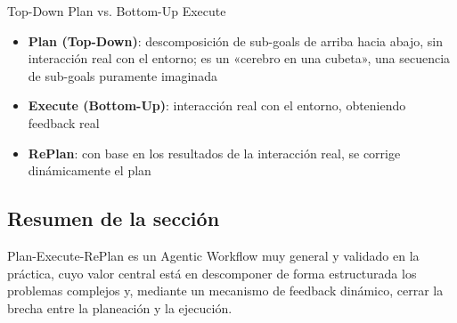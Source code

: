 \begin{knowledgebox}{Top-Down Plan vs. Bottom-Up Execute}
\begin{itemize}
    \item \textbf{Plan (Top-Down)}: descomposición de sub-goals de arriba hacia abajo, sin interacción real con el entorno; es un «cerebro en una cubeta», una secuencia de sub-goals puramente imaginada
    \item \textbf{Execute (Bottom-Up)}: interacción real con el entorno, obteniendo feedback real
    \item \textbf{RePlan}: con base en los resultados de la interacción real, se corrige dinámicamente el plan
\end{itemize}
\end{knowledgebox}

\subsection{Resumen de la sección}

Plan-Execute-RePlan es un Agentic Workflow muy general y validado en la práctica, cuyo valor central está en descomponer de forma estructurada los problemas complejos y, mediante un mecanismo de feedback dinámico, cerrar la brecha entre la planeación y la ejecución.
